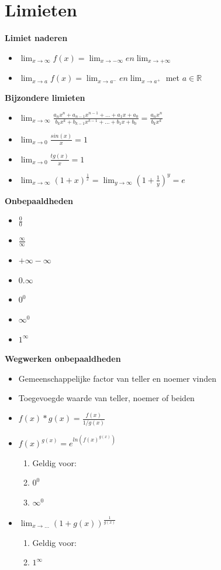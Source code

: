 \documentclass[12pt]{report}
\newcommand{\important}[1] {\textbf{\color{orange}#1}}
\begin{document}
\chapter{Limieten}
\important{Limiet naderen}
\begin{itemize}
 \item $\lim_{x\to\infty} f(x) = \lim_{x\to-\infty} en \lim_{x\to+\infty}$
 \item $\lim_{x\to a} f(x) = \lim_{x\to a^-} en \lim_{x\to a^+}$ met $a \in \mathbb{R}$
\end{itemize}
\important{Bijzondere limieten}
\begin{itemize}
 \item $\lim_{x\to\infty} 
 \frac{a_nx^n + a_{n - 1}x^{n - 1} + ... + a_1x + a_0}{b_kx^k + b_{k - 1}x^{k - 1} + ... + b_1x + b_0}
 = \frac{a_nx^n}{b_kx^k}$
 \item $\lim_{x\to0} \frac{sin(x)}{x} = 1$
 \item $\lim_{x\to0} \frac{tg(x)}{x} = 1$
 \item $\lim_{x\to\infty} (1 + x)^{\frac{1}{x}} = \lim_{y\to\infty}(1 + \frac{1}{y})^y = e$
\end{itemize}
\important{Onbepaaldheden}
\begin{itemize}
 \item $\frac{0}{0}$
 \item $\frac{\infty}{\infty}$
 \item $+ \infty - \infty$
 \item $0 . \infty$
 \item $0^0$
 \item $\infty^0$
 \item $1^\infty$
\end{itemize}
\important{Wegwerken onbepaaldheden}
\begin{itemize}
 \item Gemeenschappelijke factor van teller en noemer vinden
 \item Toegevoegde waarde van teller, noemer of beiden
 \item $f(x) * g(x) = \frac{f(x)}{1/g(x)}$
 \item $f(x)^{g(x)} = e^{ln(f(x)^{g(x)})}$
 \begin{enumerate}[label={}]
     \item Geldig voor:
     \item $0^0$
     \item $\infty^0$
  \end{enumerate}
 \item $\lim_{x\to...} (1 + g(x))^{\frac{1}{g(x)}}$
  \begin{enumerate}[label={}]
       \item Geldig voor:
    \item $1^\infty$
  \end{enumerate}

\end{itemize}
\end{document}

